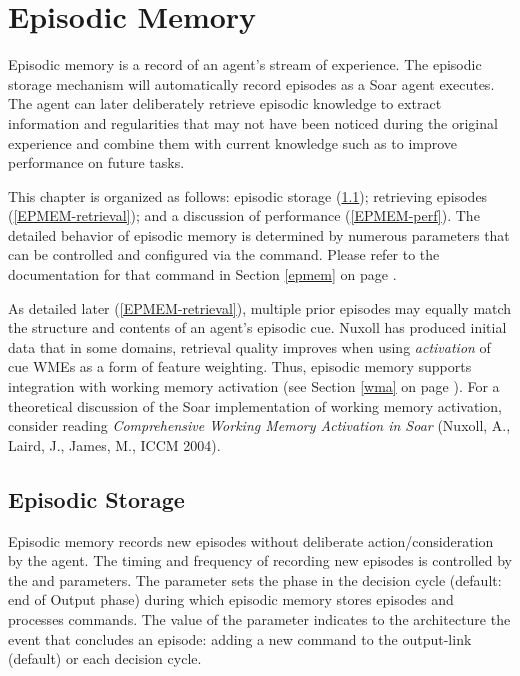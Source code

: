 \chapter{Episodic Memory}
\label{EPMEM}

Episodic memory is a record of an agent's stream of experience. The episodic storage mechanism will automatically record episodes as a Soar agent executes. The agent can later deliberately retrieve episodic knowledge to extract information and regularities that may not have been noticed during the original experience and combine them with current knowledge such as to improve performance on future tasks.

This chapter is organized as follows: episodic storage (\ref{EPMEM-storage}); retrieving episodes (\ref{EPMEM-retrieval}); and a discussion of performance (\ref{EPMEM-perf}). The detailed behavior of episodic memory is determined by numerous parameters that can be controlled and configured via the  command. Please refer to the documentation for that command in Section \ref{epmem} on page \pageref{epmem}.

%
As detailed later (\ref{EPMEM-retrieval}), multiple prior episodes may equally match the structure and contents of an agent's episodic cue.  Nuxoll has produced initial data that in some domains, retrieval quality improves when using \emph{activation} of cue WMEs as a form of feature weighting.  Thus, episodic memory supports integration with working memory activation (see Section \ref{wma} on page \pageref{wma}).  For a theoretical discussion of the Soar implementation of working memory activation, consider reading \emph{Comprehensive Working Memory Activation in Soar} (Nuxoll, A., Laird, J., James, M., ICCM 2004).

\section{Episodic Storage}
\label{EPMEM-storage}

Episodic memory records new episodes without deliberate action/consideration by the agent. The timing and frequency of recording new episodes is controlled by the  and  parameters.  The  parameter sets the phase in the decision cycle (default: end of Output phase) during which episodic memory stores episodes and processes commands.  The value of the  parameter indicates to the architecture the event that concludes an episode: adding a new command to the output-link (default) or each decision cycle.

